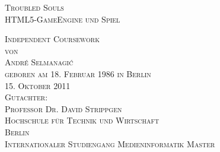 \thispagestyle{empty}


\begin{center}

\vspace*{2cm}
\Large
\textsc{Troubled Souls}\\
\textsc{HTML5-GameEngine und Spiel}

\vspace{4cm}

\textsc{Independent Coursework\\[0.5\baselineskip]
von\\[0.5\baselineskip]
André Selmanagi\'{c}\\
{\normalsize \textsc{geboren am 18. Februar 1986 in Berlin}}}\\

\vspace{4cm}
\textsc{15. Oktober 2011}\\ %

\vspace{1cm}
\textsc{Gutachter:\\
Professor Dr. David Strippgen}\\

\vspace{1cm}
\textsc{Hochschule für Technik und Wirtschaft\\
Berlin\\
Internationaler Studiengang Medieninformatik Master}

\end{center}

\addtocounter{page}{-1}
